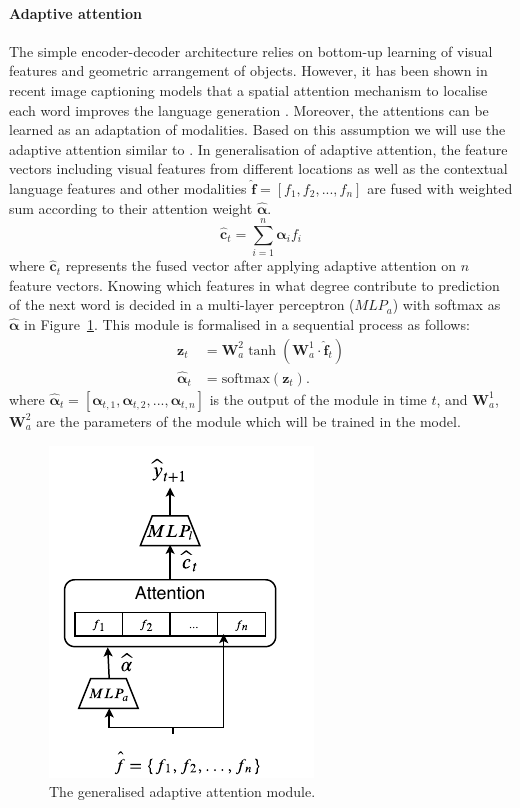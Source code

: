 \paragraph{Adaptive attention}
The simple encoder-decoder architecture relies on bottom-up learning of visual features and geometric arrangement of objects.
However, it has been shown in recent image captioning models that a spatial attention mechanism to localise each word improves the language generation \cite{xu2015show}. 
Moreover, the attentions can be learned as an adaptation of modalities. 
Based on this assumption we will use the adaptive attention similar to \cite{lu2017knowing}.
In generalisation of adaptive attention, the feature vectors including visual features from different locations as well as the contextual language features and other modalities $\hat{\bm{f}} = [f_1, f_2, ..., f_n]$ are fused with weighted sum according to their attention weight $\hat{\bm{\alpha}}$. 
\begin{equation}
\hat{\bm{c}}_t = \sum_{i=1}^n \bm{\alpha}_{i} f_{i}
\end{equation}
\noindent where $\hat{\bm{c}}_t$ represents the fused vector after applying adaptive attention on $n$ feature vectors. Knowing which features in what degree contribute to prediction of the next word is decided in a multi-layer perceptron ($MLP_a$) with softmax as $\hat{\bm{\alpha}}$ in Figure~\ref{inlg2019:fig:attention}. %
This module is formalised in a sequential process as follows:
\begin{align*}
\bm{z}_t &= \bm{W}_{a}^2 \tanh(\bm{W}_{a}^1 \cdot \hat{\bm{f}}_t) \\
\hat{\bm{\alpha}}_t &= \textrm{softmax}(\bm{z}_t).
\end{align*}
\noindent where $\hat{\bm{\alpha}}_t = [\bm{\alpha}_{t,1}, \bm{\alpha}_{t,2}, ..., \bm{\alpha}_{t,n}]$ is the output of the module in time $t$, and $\bm{W}_{a}^1$,$\bm{W}_{a}^2$ are the parameters of the module which will be trained in the model.
\begin{figure}[ht!]
	\centering
	\includegraphics[width=0.3\linewidth]{studies/inlg2019/figures/merge_attention.pdf}
	\caption{The generalised adaptive attention module.}\label{inlg2019:fig:attention}
\end{figure}

